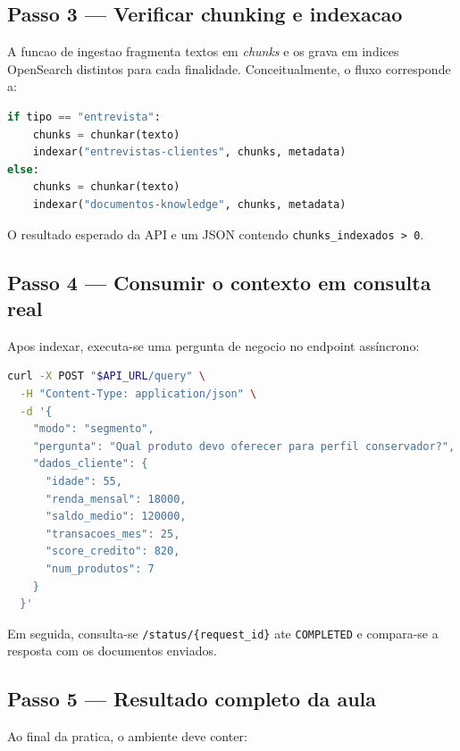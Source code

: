 \subsection{Passo 3 --- Verificar chunking e indexacao}

A funcao de ingestao fragmenta textos em \textit{chunks}
e os grava em indices OpenSearch distintos para cada finalidade.
Conceitualmente, o fluxo corresponde a:

\begin{lstlisting}[language=Python,
  caption={Fluxo simplificado da indexacao no ingester.},
  label={lst:ingester_fluxo_simplificado}]
if tipo == "entrevista":
    chunks = chunkar(texto)
    indexar("entrevistas-clientes", chunks, metadata)
else:
    chunks = chunkar(texto)
    indexar("documentos-knowledge", chunks, metadata)
\end{lstlisting}

O resultado esperado da API e um JSON contendo \texttt{chunks\_indexados > 0}.

\subsection{Passo 4 --- Consumir o contexto em consulta real}

Apos indexar, executa-se uma pergunta de negocio no endpoint ass\'incrono:

\begin{lstlisting}[language=bash,
  caption={Consulta de negocio para verificar uso do contexto RAG.},
  label={lst:consulta_rag_laboratorio}]
curl -X POST "$API_URL/query" \
  -H "Content-Type: application/json" \
  -d '{
    "modo": "segmento",
    "pergunta": "Qual produto devo oferecer para perfil conservador?",
    "dados_cliente": {
      "idade": 55,
      "renda_mensal": 18000,
      "saldo_medio": 120000,
      "transacoes_mes": 25,
      "score_credito": 820,
      "num_produtos": 7
    }
  }'
\end{lstlisting}

Em seguida, consulta-se \texttt{/status/\{request\_id\}} ate \texttt{COMPLETED}
e compara-se a resposta com os documentos enviados.

\subsection{Passo 5 --- Resultado completo da aula}

Ao final da pratica, o ambiente deve conter:

